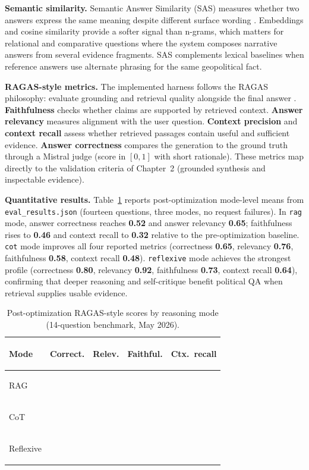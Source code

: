 \textbf{Semantic similarity.} Semantic Answer Similarity (SAS) measures whether two answers express the same meaning despite different surface wording \cite{risch-sas}. Embeddings and cosine similarity provide a softer signal than n-grams, which matters for relational and comparative questions where the system composes narrative answers from several evidence fragments. SAS complements lexical baselines when reference answers use alternate phrasing for the same geopolitical fact.

\textbf{RAGAS-style metrics.} The implemented harness follows the RAGAS philosophy: evaluate grounding and retrieval quality alongside the final answer \cite{ragas-paper,ragas-answer-correctness}. \textbf{Faithfulness} checks whether claims are supported by retrieved context. \textbf{Answer relevancy} measures alignment with the user question. \textbf{Context precision} and \textbf{context recall} assess whether retrieved passages contain useful and sufficient evidence. \textbf{Answer correctness} compares the generation to the ground truth through a Mistral judge (score in $[0,1]$ with short rationale). These metrics map directly to the validation criteria of Chapter~2 (grounded synthesis and inspectable evidence).

\textbf{Quantitative results.} Table~\ref{tab:mode-comparison} reports post-optimization mode-level means from \texttt{eval\_results.json} (fourteen questions, three modes, no request failures). In \texttt{rag} mode, answer correctness reaches \textbf{0.52} and answer relevancy \textbf{0.65}; faithfulness rises to \textbf{0.46} and context recall to \textbf{0.32} relative to the pre-optimization baseline. \texttt{cot} mode improves all four reported metrics (correctness \textbf{0.65}, relevancy \textbf{0.76}, faithfulness \textbf{0.58}, context recall \textbf{0.48}). \texttt{reflexive} mode achieves the strongest profile (correctness \textbf{0.80}, relevancy \textbf{0.92}, faithfulness \textbf{0.73}, context recall \textbf{0.64}), confirming that deeper reasoning and self-critique benefit political QA when retrieval supplies usable evidence.

\begin{table}[H]
\centering
\small
\setlength{\tabcolsep}{6pt}
\renewcommand{\arraystretch}{1.35}
\begin{tabularx}{\textwidth}{@{}>{\bfseries\raggedright\arraybackslash}p{2.2cm}>{\centering\arraybackslash}X>{\centering\arraybackslash}X>{\centering\arraybackslash}X>{\centering\arraybackslash}X@{}}
\toprule
\rowcolor{lightblue}
Mode & Correct. & Relev. & Faithful. & Ctx.\ recall \\
\midrule
RAG & 0.52 & 0.65 & 0.46 & 0.32 \\
CoT & 0.65 & 0.76 & 0.58 & 0.48 \\
Reflexive & 0.80 & 0.92 & 0.73 & 0.64 \\
\bottomrule
\end{tabularx}
\caption{Post-optimization RAGAS-style scores by reasoning mode (14-question benchmark, May 2026).}
\label{tab:mode-comparison}
\end{table}

